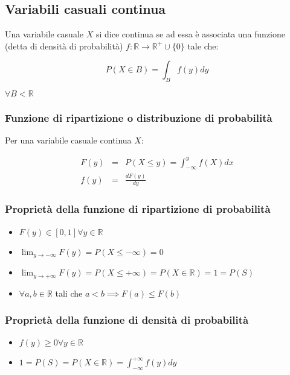 \documentclass{article}
\begin{document}
\subsection{Variabili casuali continua}

Una variabile casuale $X$ si dice continua se ad essa è associata una funzione (detta di densità di probabilità) $f: \mathbb{R} \to \mathbb{R}^+ \cup \{0\}$ tale che:

$$
P(X \in B) = \int_B f(y)dy
$$

\noindent
$\forall B < \mathbb{R}$

\subsubsection{Funzione di ripartizione o distribuzione di probabilità}

Per una variabile casuale continua $X$:

$$
\begin{matrix}
F(y) &=& P(X \leq y) = \int^y_{-\infty} f(X)dx \\
f(y) &=& \frac{dF(y)}{dy}
\end{matrix}
$$

\subsubsection{Proprietà della funzione di ripartizione di probabilità}

\begin{itemize}
    \item $F(y) \in [0,1] \forall y \in \mathbb{R}$
    \item $\lim_{y \to -\infty} F(y) = P(X \leq -\infty) = 0$
    \item $\lim_{y \to +\infty} F(y) = P(X \leq +\infty) = P(X \in \mathbb{R}) = 1 = P(S)$
    \item $\forall a,b \in \mathbb{R}$ tali che $a < b \implies F(a) \leq F(b)$
\end{itemize}

\subsubsection{Proprietà della funzione di densità di probabilità}

\begin{itemize}
    \item $f(y) \geq 0 \forall y \in \mathbb{R}$
    \item $1 = P(S) = P(X \in \mathbb{R}) = \int^{+\infty}_{-\infty} f(y)dy$
\end{itemize}
\end{document}
